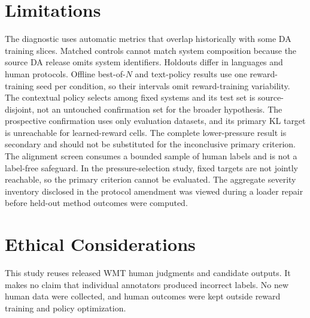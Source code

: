 \documentclass[11pt]{article}
\begin{document}
\section*{Limitations}

The diagnostic uses automatic metrics that overlap historically with some DA
training slices.  Matched controls cannot match system composition because the
source DA release omits system identifiers.  Holdouts differ in languages and
human protocols.  Offline best-of-$N$ and text-policy results use one reward-training seed per
condition, so their intervals omit reward-training variability.  The
contextual policy selects among fixed systems and its test set is
source-disjoint, not an untouched confirmation set for the broader hypothesis.
The prospective confirmation uses only \ConfirmDatasets{} evaluation datasets,
and its primary KL target is unreachable for \ConfirmPrimaryUnreachable{}
learned-reward cells.  The complete lower-pressure result is secondary and
should not be substituted for the inconclusive primary criterion.  The
alignment screen consumes a bounded sample of human labels and is not a
label-free safeguard.  In the pressure-selection study, \SafeMissingTargets{}
fixed targets are not jointly reachable, so the primary criterion cannot be
evaluated.  The aggregate severity inventory disclosed in the protocol
amendment was viewed during a loader repair before held-out method outcomes were
computed.

\section*{Ethical Considerations}

This study reuses released WMT human judgments and candidate outputs.  It makes
no claim that individual annotators produced incorrect labels.  No new human
data were collected, and human outcomes were kept outside reward training and
policy optimization.


\end{document}
